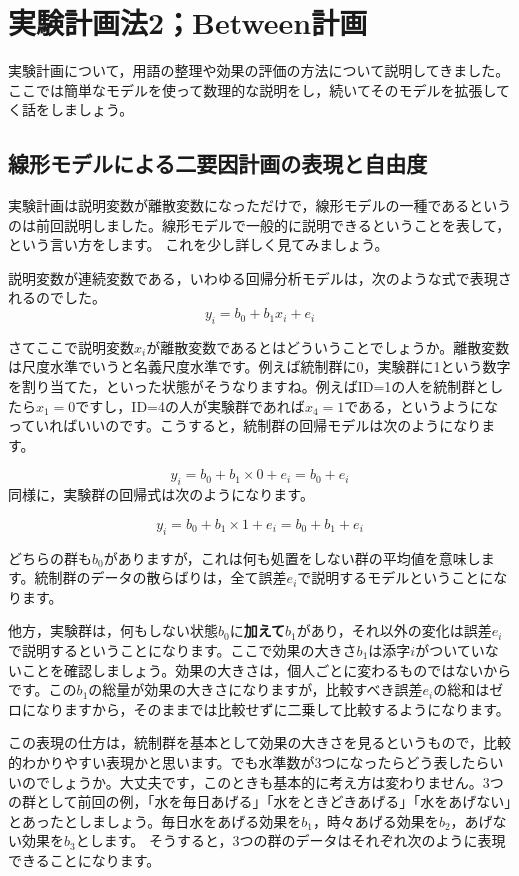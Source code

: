 \documentclass{ltjbook}
\begin{document}
 
\chapter{実験計画法2；Between計画} 
\label{chapter13} 

実験計画について，用語の整理や効果の評価の方法について説明してきました。
ここでは簡単なモデルを使って数理的な説明をし，続いてそのモデルを拡張してく話をしましょう。

\section{線形モデルによる二要因計画の表現と自由度}
実験計画は説明変数が離散変数になっただけで，線形モデルの一種であるというのは前回説明しました。線形モデルで一般的に説明できるということを表して，という言い方をします。
これを少し詳しく見てみましょう。

説明変数が連続変数である，いわゆる回帰分析モデルは，次のような式で表現されるのでした。
\[ y_i = b_0 + b_1 x_i + e_i \]

さてここで説明変数$x_{i}$が離散変数であるとはどういうことでしょうか。離散変数は尺度水準でいうと名義尺度水準です。例えば統制群に0，実験群に1という数字を割り当てた，といった状態がそうなりますね。例えばID=1の人を統制群としたら$x_1=0$ですし，ID=4の人が実験群であれば$x_4=1$である，というようになっていればいいのです。こうすると，統制群の回帰モデルは次のようになります。

\[ y_i = b_0 + b_1 \times 0 + e_i = b_0 + e_i \]
同様に，実験群の回帰式は次のようになります。

\[ y_i = b_0 + b_1 \times 1 + e_i = b_0 + b_1 + e_i \]

どちらの群も$b_0$がありますが，これは何も処置をしない群の平均値を意味します。統制群のデータの散らばりは，全て誤差$e_i$で説明するモデルということになります。

他方，実験群は，何もしない状態$b_0$に\textbf{加えて}$b_1$があり，それ以外の変化は誤差$e_i$で説明するということになります。ここで効果の大きさ$b_1$は添字$i$がついていないことを確認しましょう。効果の大きさは，個人ごとに変わるものではないからです。この$b_1$の総量が効果の大きさになりますが，比較すべき誤差$e_i$の総和はゼロになりますから，そのままでは比較せずに二乗して比較するようになります。

この表現の仕方は，統制群を基本として効果の大きさを見るというもので，比較的わかりやすい表現かと思います。でも水準数が3つになったらどう表したらいいのでしょうか。大丈夫です，このときも基本的に考え方は変わりません。3つの群として前回の例，「水を毎日あげる」「水をときどきあげる」「水をあげない」とあったとしましょう。毎日水をあげる効果を$b_1$，時々あげる効果を$b_2$，あげない効果を$b_3$とします。
そうすると，3つの群のデータはそれぞれ次のように表現できることになります。
\end{document}
